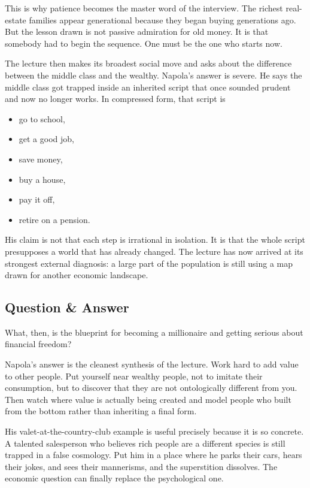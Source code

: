 This is why patience becomes the master word of the interview. The richest real-estate families appear generational because they began buying generations ago. But the lesson drawn is not passive admiration for old money. It is that somebody had to begin the sequence. One must be the one who starts now.

The lecture then makes its broadest social move and asks about the difference between the middle class and the wealthy. Napola's answer is severe. He says the middle class got trapped inside an inherited script that once sounded prudent and now no longer works. In compressed form, that script is
\begin{itemize}
\item go to school,
\item get a good job,
\item save money,
\item buy a house,
\item pay it off,
\item retire on a pension.
\end{itemize}
His claim is not that each step is irrational in isolation. It is that the whole script presupposes a world that has already changed. The lecture has now arrived at its strongest external diagnosis: a large part of the population is still using a map drawn for another economic landscape.

\subsection{Question \& Answer}

What, then, is the blueprint for becoming a millionaire and getting serious about financial freedom?

Napola's answer is the cleanest synthesis of the lecture. Work hard to add value to other people. Put yourself near wealthy people, not to imitate their consumption, but to discover that they are not ontologically different from you. Then watch where value is actually being created and model people who built from the bottom rather than inheriting a final form.

His valet-at-the-country-club example is useful precisely because it is so concrete. A talented salesperson who believes rich people are a different species is still trapped in a false cosmology. Put him in a place where he parks their cars, hears their jokes, and sees their mannerisms, and the superstition dissolves. The economic question can finally replace the psychological one.

